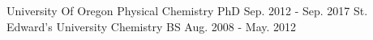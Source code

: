 \begin{cvschools}
	\cvschool
		{University Of Oregon}
		{Physical Chemistry}
		{PhD}
		{Sep. 2012 - Sep. 2017}
	\cvschool
		{St. Edward's University}
		{Chemistry}
		{BS}
		{Aug. 2008 - May. 2012}
\end{cvschools}
